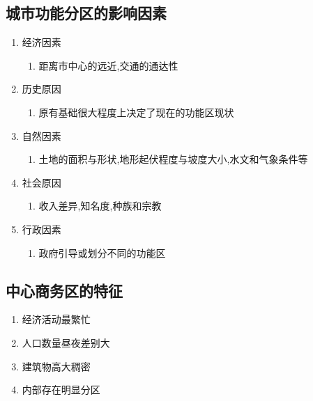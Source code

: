 \documentclass[a4paper]{article}
\begin{document}
    \subsection{城市功能分区的影响因素}
    \begin{enumerate}
        \item 经济因素
        \begin{enumerate}
            \item 距离市中心的远近,交通的通达性
        \end{enumerate}
        \item 历史原因
        \begin{enumerate}
            \item 原有基础很大程度上决定了现在的功能区现状
        \end{enumerate}
        \item 自然因素
        \begin{enumerate}
            \item 土地的面积与形状,地形起伏程度与坡度大小,水文和气象条件等
        \end{enumerate}
        \item 社会原因
        \begin{enumerate}
            \item 收入差异,知名度,种族和宗教
        \end{enumerate}
        \item 行政因素
        \begin{enumerate}
            \item 政府引导或划分不同的功能区
        \end{enumerate}
    \end{enumerate}
    \subsection{中心商务区的特征}
    \begin{enumerate}
        \item 经济活动最繁忙
        \item 人口数量昼夜差别大
        \item 建筑物高大稠密
        \item 内部存在明显分区
    \end{enumerate}
\end{document}
